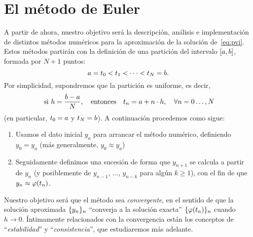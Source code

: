 \section{El método de Euler}

A partir de ahora, nuestro objetivo será la descripción, análisis e
implementación de distintos métodos numéricos para la aproximación de
la solución de~\eqref{eq:pvi}. Estos métodos partirán con la
definición de una partición del intervalo $[\ta,\tb]$, formada por
$N+1$ puntos:
\begin{equation*}
  \ta=\tt_0 < \tt_1 < \cdots < \tt_N=\tb.
\end{equation*}
Por simplicidad, supondremos que la partición es uniforme, es decir,
\begin{equation*}
  \text{ si } h=\frac{b-a}{N}, \quad \text{entonces} \quad
  \tt_n=\ta+n\cdot h,\quad \forall n=0\dots,N
\end{equation*}
(en particular, $\tt_0=a$ y $\tt_N=b$). A continuación procedemos como
sigue:
\begin{enumerate}
\item Usamos el dato inicial $y_a$ para arrancar el método numérico,
  definiendo $y_0=y_a$ (más generalmente, $y_0\approx y_a$)
\item Seguidamente definimos una sucesión de forma que $y_{n+1}$ se
  calcula a partir de $y_n$ (y posiblemente de $y_{n-1}$, ...,
  $y_{n-k}$ para algún $k\ge 1$), con el fin de que
  $y_n\approx\sol(\tn)$.
\end{enumerate}
Nuestro objetivo será que el método sea \textit{convergente}, en el
sentido de que la solución aproximada $\{\yn\}_n$ ``converja a la
solución exacta'' $\{\sol(\tn)\}_n$ cuando $h\to 0$. Íntimamente
relacionados con la convergencia están los conceptos de
``\textit{estabilidad}'' y ``\textit{consistencia}'', que estudiaremos
más adelante.

